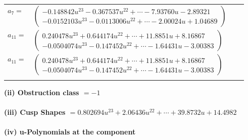 \documentclass[1p]{elsarticle_modified}
\theoremstyle{definition}
\begin{document}
\begin{tabular}{m{7pt} m{180pt} m{7pt} m{180pt} }
\flushright $a_{7}=$&$\begin{pmatrix}-0.148842 u^{23}-0.367537 u^{22}+\cdots-7.93760 u-2.89321\\-0.0152103 u^{23}-0.0113006 u^{22}+\cdots-2.00024 u+1.04689\end{pmatrix}$ \\
\flushright $a_{11}=$&$\begin{pmatrix}0.240478 u^{23}+0.644174 u^{22}+\cdots+11.8851 u+8.16867\\-0.0504074 u^{23}-0.147452 u^{22}+\cdots-1.64431 u-3.00383\end{pmatrix}$\\ \flushright $a_{11}=$&$\begin{pmatrix}0.240478 u^{23}+0.644174 u^{22}+\cdots+11.8851 u+8.16867\\-0.0504074 u^{23}-0.147452 u^{22}+\cdots-1.64431 u-3.00383\end{pmatrix}$\\&\end{tabular}
\flushleft \textbf{(ii) Obstruction class $= -1$}\\~\\
\flushleft \textbf{(iii) Cusp Shapes $= 0.802694 u^{23}+2.06436 u^{22}+\cdots+39.8732 u+14.4982$}\\~\\
\newpage\renewcommand{\arraystretch}{1}
\flushleft \textbf{(iv) u-Polynomials at the component}\newline \\
\end{document}
